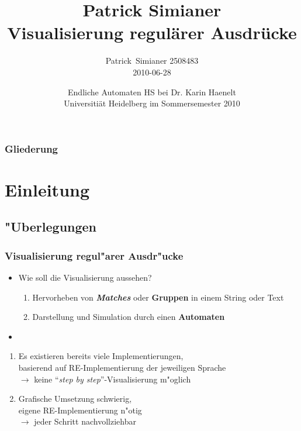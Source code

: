 \documentclass[ignorenonframetext]{beamer}
\title[regexvis]{Patrick Simianer\\ Visualisierung regulärer Ausdrücke}
\author{Patrick~Simianer \tiny 2508483\\\normalsize 2010-06-28}
\date{Endliche Automaten HS bei Dr. Karin Haenelt\\ Universitiät Heidelberg im Sommersemester 2010}
\begin{document}
\frame[plain]{\titlepage}



\begin{frame}[plain]
    \frametitle{Gliederung}
    \tableofcontents
\end{frame}



\section{Einleitung}


\subsection{"Uberlegungen}
\begin{frame}
    \frametitle{Visualisierung regul"arer Ausdr"ucke}
	
	\begin{itemize}
        \item[] Wie soll die Visualisierung aussehen?
        \begin{enumerate}
            \item Hervorheben von \textit{\textbf{Matches}} oder \textbf{Gruppen} in einem String oder Text
            \item Darstellung und Simulation durch einen \textbf{Automaten}
        \end{enumerate}
        \item[]
	\end{itemize}
    \begin{enumerate}
        \item Es existieren bereits viele Implementierungen, \\ basierend auf RE-Implementierung der jeweiligen Sprache\\ $\rightarrow$ keine ``\textit{step by step}''-Visualisierung m"oglich
        \item Grafische Umsetzung schwierig,\\ eigene RE-Implementierung n"otig\\ $\rightarrow$ jeder Schritt nachvollziehbar
    \end{enumerate}
\end{frame}
\end{document}
